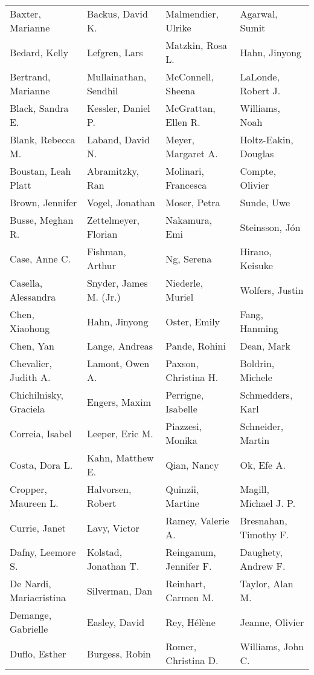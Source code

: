 \begin{ThreePartTable}
{\begin{longtable}[c]{llll}
            Baxter, Marianne&Backus, David K.&Malmendier, Ulrike&Agarwal, Sumit\\
            Bedard, Kelly&Lefgren, Lars&Matzkin, Rosa L.&Hahn, Jinyong\\
            Bertrand, Marianne&Mullainathan, Sendhil&McConnell, Sheena&LaLonde, Robert J.\\
            Black, Sandra E.&Kessler, Daniel P.&McGrattan, Ellen R.&Williams, Noah\\
            Blank, Rebecca M.&Laband, David N.&Meyer, Margaret A.&Holtz-Eakin, Douglas\\
            Boustan, Leah Platt&Abramitzky, Ran&Molinari, Francesca&Compte, Olivier\\
            Brown, Jennifer&Vogel, Jonathan&Moser, Petra&Sunde, Uwe\\
            Busse, Meghan R.&Zettelmeyer, Florian&Nakamura, Emi&Steinsson, Jón\\
            Case, Anne C.&Fishman, Arthur&Ng, Serena&Hirano, Keisuke\\
            Casella, Alessandra&Snyder, James M. (Jr.)&Niederle, Muriel&Wolfers, Justin\\
            Chen, Xiaohong&Hahn, Jinyong&Oster, Emily&Fang, Hanming\\
            Chen, Yan&Lange, Andreas&Pande, Rohini&Dean, Mark\\
            Chevalier, Judith A.&Lamont, Owen A.&Paxson, Christina H.&Boldrin, Michele\\
            Chichilnisky, Graciela&Engers, Maxim&Perrigne, Isabelle&Schmedders, Karl\\
            Correia, Isabel&Leeper, Eric M.&Piazzesi, Monika&Schneider, Martin\\
            Costa, Dora L.&Kahn, Matthew E.&Qian, Nancy&Ok, Efe A.\\
            Cropper, Maureen L.&Halvorsen, Robert&Quinzii, Martine&Magill, Michael J. P.\\
            Currie, Janet&Lavy, Victor&Ramey, Valerie A.&Bresnahan, Timothy F.\\
            Dafny, Leemore S.&Kolstad, Jonathan T.&Reinganum, Jennifer F.&Daughety, Andrew F.\\
            De Nardi, Mariacristina&Silverman, Dan&Reinhart, Carmen M.&Taylor, Alan M.\\
            Demange, Gabrielle&Easley, David&Rey, Hélène&Jeanne, Olivier\\
            Duflo, Esther&Burgess, Robin&Romer, Christina D.&Williams, John C.\\

\end{longtable}}
\end{ThreePartTable}
